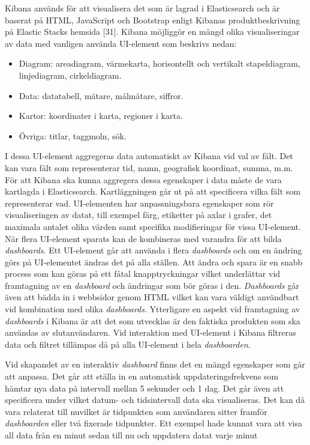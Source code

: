 \documentclass[12pt]{kththesis}
\begin{document}
Kibana används för att visualisera det som är lagrad i Elasticsearch och är baserat på HTML, JavaScript och Bootstrap enligt Kibanas produktbeskrivning på Elastic Stacks hemsida [31]. Kibana möjliggör en mängd olika visualiseringar av data med vanligen använda UI-element som beskrivs nedan:

\begin{itemize}
\item Diagram: areadiagram, värmekarta, horisontellt och vertikalt stapeldiagram, linjediagram, cirkeldiagram.
\item Data: datatabell, mätare, målmätare, siffror.
\item Kartor: koordinater i karta, regioner i karta.
\item Övriga: titlar, taggmoln, sök.
\end{itemize}

I dessa UI-element aggregeras data automatiskt av Kibana vid val av fält. Det kan vara fält som representerar tid, namn, geografisk koordinat, summa, m.m. För att Kibana ska kunna aggregera dessa egenskaper i data måste de vara kartlagda i Elasticsearch. Kartläggningen går ut på att specificera vilka fält som representerar vad. UI-elementen har anpassningsbara egenskaper som rör visualiseringen av datat, till exempel färg, etiketter på axlar i grafer, det maximala antalet olika värden samt specifika modifieringar för vissa UI-element. När flera UI-element sparats kan de kombineras med varandra för att bilda \textit{dashboards}. Ett UI-element går att använda i flera \textit{dashboards} och om en ändring görs på UI-elementet ändras det på alla ställen. Att ändra och spara är en snabb process som kan göras på ett fåtal knapptryckningar vilket underlättar vid framtagning av en \textit{dashboard} och ändringar som bör göras i den. \textit{Dashboards} går även att bädda in i webbsidor genom HTML vilket kan vara väldigt användbart vid kombination med olika \textit{dashboards}. Ytterligare en aspekt vid framtagning av \textit{dashboards} i Kibana är att det som utvecklas är den faktiska produkten som ska användas av slutanvändaren. Vid interaktion med UI-element i Kibana filtreras data och filtret tillämpas då på alla UI-element i hela \textit{dashboarden}.

Vid skapandet av en interaktiv \textit{dashboard} finns det en mängd egenskaper som går att anpassa. Det går att ställa in en automatisk uppdateringsfrekvens som hämtar nya data på intervall mellan 5 sekunder och 1 dag. Det går även att specificera under vilket datum- och tidsintervall data ska visualiseras. Det kan då vara relaterat till nuvilket är tidpunkten som användaren sitter framför \textit{dashboarden} eller två fixerade tidpunkter. Ett exempel hade kunnat vara att visa all data från en minut sedan till nu och uppdatera datat varje minut
\end{document}
